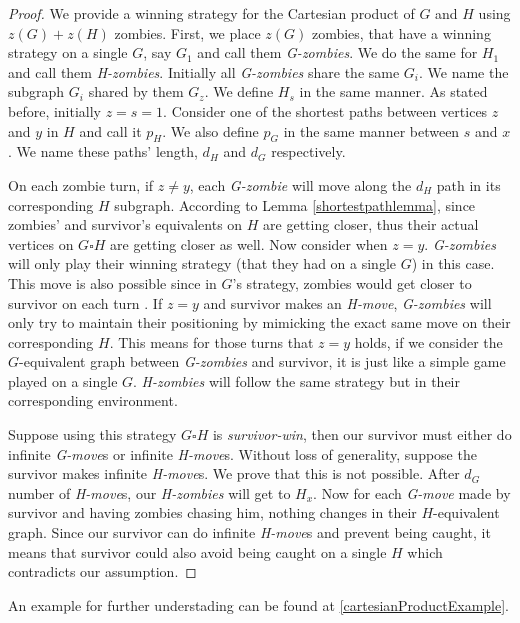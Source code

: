\documentclass[1p]{elsarticle}
\begin{document}
\begin{proof}
	We provide a winning strategy for the Cartesian product of $G$ and $H$ using $z(G)+z(H)$ zombies. First, we place
	$z(G)$ zombies, that have a winning strategy on a single $G$, say $G_{1}$ and call them {\it G-zombies}. We do the
	same for $H_{1}$ and call them {\it H-zombies}. Initially all {\it G-zombies} share the same $G_{i}$. We name the
	subgraph $G_{i}$ shared by them $G_{z}$. We define $H_{s}$ in the same manner. As stated before, initially $z=s=1$.
	Consider one of the shortest paths between vertices $z$ and $y$ in $H$ and call it $p_H$. We also define $p_G$ in
	the same manner between $s$ and $x$. We name these paths' length, $d_H$ and $d_G$ respectively. 


	On each zombie turn, if $z \neq y$, each {\it G-zombie} will move along the $d_H$ path in its corresponding $H$
	subgraph. According to Lemma \ref{shortestpathlemma}, since zombies' and survivor's equivalents on $H$ are getting
	closer, thus their actual vertices on $G \square H$ are getting closer as well. Now consider when $z = y$. {\it
	G-zombies} will only play their winning strategy (that they had on a single $G$) in this case. This move is also
	possible since in $G$'s strategy, zombies would get closer to survivor on each turn . If $z = y$ and survivor makes
	an {\it H-move}, {\it G-zombies} will only try to maintain their positioning by mimicking the exact same move on
	their corresponding $H$. This means for those turns that $z=y$ holds, if we consider the $G$-equivalent graph
	between {\it G-zombies} and survivor, it is just like a simple game played on a single $G$. {\it H-zombies} will
	follow the same strategy but in their corresponding environment.
	
	
	Suppose using this strategy $G \square H$ is {\it survivor-win}, then our survivor must either do infinite {\it
	G-move}s or infinite {\it H-move}s. Without loss of generality, suppose the survivor makes infinite
	{\it H-move}s. We prove that this is not possible. After $d_G$ number of {\it H-move}s, our {\it H-zombies} will get
	to $H_x$. Now for each {\it G-move} made by survivor and having zombies chasing him, nothing changes in their
	$H$-equivalent graph. Since our survivor can do infinite {\it H-move}s and prevent being caught, it means that
	survivor could also avoid being caught on a single $H$ which contradicts our assumption.
	
\end{proof}
An example for further understading can be found at \ref{cartesianProductExample}.
\end{document}
